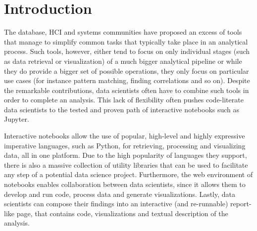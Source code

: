 \section{Introduction}
\label{section:introduction}




The database, HCI and systems communities have proposed an excess of tools that manage to simplify common tasks that typically take place in an analytical process. Such tools, however, either tend to focus on only individual stages (such as data retrieval or visualization) of a much bigger analytical pipeline or while they do provide a bigger set of possible operations, they only focus on particular use cases (for instance pattern matching, finding correlations and so on). Despite the remarkable contributions, data scientists often have to combine such tools in order to complete an analysis. This lack of flexibility often pushes code-literate data scientists to the tested and proven path of interactive notebooks such as Jupyter.

Interactive notebooks allow the use of popular, high-level and highly expressive imperative languages, such as Python, for retrieving, processing and visualizing data, all in one platform. Due to the high popularity of languages they support, there is also a massive collection of utility libraries that can be used to facilitate any step of a potential data science project. Furthermore, the web environment of notebooks enables collaboration between data scientists, since it allows them to develop and run code, process data and generate visualizations. Lastly, data scientists can compose their findings into an interactive (and re-runnable) report-like page, that contains code, visualizations and textual description of the analysis.

